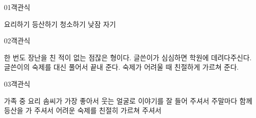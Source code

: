 \documentclass[fs13,seriesSau]{korfarm-base}
\begin{document}

\begin{kfQBlock}{01}{객관식}
\begin{kfChoices}
\kfChoice 요리하기
\kfChoice 등산하기
\kfChoice 청소하기
\kfChoice 낮잠 자기
\end{kfChoices}
\end{kfQBlock}
\begin{kfQBlock}{02}{객관식}
\begin{kfChoices}
\kfChoice 한 번도 장난을 친 적이 없는 점잖은 형이다.
\kfChoice 글쓴이가 심심하면 학원에 데려다주신다.
\kfChoice 글쓴이의 숙제를 대신 풀어서 끝내 준다.
\kfChoice 숙제가 어려울 때 친절하게 가르쳐 준다.
\end{kfChoices}
\end{kfQBlock}
\begin{kfQBlock}{03}{객관식}
\begin{kfChoices}
\kfChoice 가족 중 요리 솜씨가 가장 좋아서
\kfChoice 웃는 얼굴로 이야기를 잘 들어 주셔서
\kfChoice 주말마다 함께 등산을 가 주셔서
\kfChoice 어려운 숙제를 친절히 가르쳐 주셔서
\end{kfChoices}
\end{kfQBlock}


\end{document}
